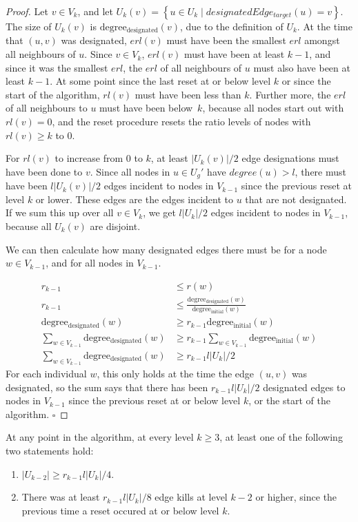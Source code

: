 \begin{proof}
Let $v \in V_k$, and let $U_k(v)=\left\{u\in U_k \mid  designatedEdge_{target}(u) = v\right\}$. 
The size of $U_k(v)$ is $\mathrm{degree_{designated}}(v)$, due to the definition of $U_k$.
At the time that $(u, v)$ was designated, $erl(v)$ must have been the smallest $erl$ amongst all neighbours of $u$.
Since $v \in V_k$, $erl(v)$ must have been at least $k-1$, and since it was the smallest $erl$, the $erl$ of all neighbours of $u$ must also have been at least $k-1$.
At some point since the last reset at or below level $k$ or since the start of the algorithm, $rl(v)$ must have been less than $k$.
Further more, the $erl$ of all neighbours to $u$ must have been below~$k$, 
because all nodes start out with $rl(v)=0$, and the reset procedure resets the ratio levels of nodes with $rl(v) \geq k$ to $0$. 

For $rl(v)$ to increase from $0$ to $k$, at least $|U_k(v)|/2$ edge designations must have been done to $v$.
Since all nodes in $u \in U_g'$ have $degree(u)>l$, there must have been $l|U_k(v)|/2$ edges incident to nodes in $V_{k-1}$ since the previous reset at level $k$ or lower.
These edges are the edges incident to $u$ that are not designated.
If we sum this up over all $v \in V_k$, we get $l|U_k|/2$ edges incident to nodes in $V_{k-1}$, because all $U_k(v)$ are disjoint.

We can then calculate how many designated edges there must be for a node $w \in V_{k-1}$, and for all nodes in $V_{k-1}$.

\begin{align*}
r_{k-1} &\leq r(w) \\
r_{k-1} &\leq \frac{\mathrm{degree_{designated}}(w)}{\mathrm{degree_{initial}}(w)}\\
\mathrm{degree_{designated}}(w) &\geq r_{k-1}\mathrm{degree_{initial}}(w)\\
\sum\limits_{w\in V_{k-1}}{\mathrm{degree_{designated}}(w)} &\geq r_{k-1}\sum\limits_{w\in V_{k-1}}{\mathrm{degree_{initial}}(w)} \\
\sum\limits_{w\in V_{k-1}}{\mathrm{degree_{designated}}(w)} &\geq r_{k-1}l|U_k|/2
\end{align*}
For each individual $w$, this only holds at the time the edge $(u, v)$ was designated, 
so the sum says that there has been $r_{k-1}l|U_k|/2$ designated edges to nodes in $V_{k-1}$ since the previous reset at or below level $k$, or the start of the algorithm.
$\square$
\end{proof}
\begin{lemma}
\label{KRGame2}
At any point in the algorithm, at every level $k \geq 3$, at least one of the following two statements hold:
\begin{enumerate}
  \item $|U_{k-2}|\geq r_{k-1}l|U_k|/4$.
  \item There was at least $r_{k-1}l|U_k|/8$ edge kills at level $k-2$ or higher, since the previous time a reset occured at or below level $k$.
\end{enumerate}
\end{lemma}
